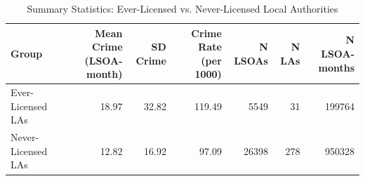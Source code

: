 \begin{table}[!h]
\centering
\caption{\label{tab:summary}Summary Statistics: Ever-Licensed vs. Never-Licensed Local Authorities}
\centering
\begin{tabular}[t]{lrrrrrr}
\toprule
Group & Mean Crime (LSOA-month) & SD Crime & Crime Rate (per 1000) & N LSOAs & N LAs & N LSOA-months\\
\midrule
Ever-Licensed LAs & 18.97 & 32.82 & 119.49 & 5549 & 31 & 199764\\
Never-Licensed LAs & 12.82 & 16.92 & 97.09 & 26398 & 278 & 950328\\
\bottomrule
\end{tabular}
\end{table}
